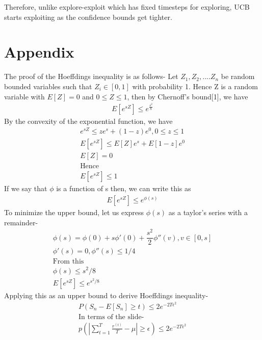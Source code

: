 \documentclass[11pt]{article}
\begin{document}
Therefore, unlike explore-exploit which has fixed timesteps for exploring, UCB starts exploiting as the confidence bounds get tighter.


\newpage
{


}

\section{Appendix}
The proof of the Hoeffdings inequality is as follows-
Let $Z_1, Z_2, .... Z_n$ be random bounded variables such that $Z_i \in [0,1]$ with probability 1. Hence Z is a random variable with $E[Z]=0$ and $0 \le Z \le 1$, then by Chernoff's bound[1], we have 
\begin{align*}
    E[e^{sZ}]\le e^{\frac{s^2}{8}}
\end{align*}
By the convexity of the exponential function, we have 
\begin{align*}
    e^{sZ} \le ze^s + (1-z)e^0, 0 \le z \le 1 \\
    E[e^{sZ}] \le E[Z]e^{s} + E[1-z]e^0 \\
    E[Z]=0 \\
    \text{Hence} \\
    E[e^{sZ}] \le 1
\end{align*}
If we say that $\phi$ is a function of s then, we can write this as
\begin{align*}
    E[e^{sZ}] \le e^{\phi(s)}
\end{align*}
To minimize the upper bound, let us express $\phi(s)$ as a taylor's series with a remainder-
\begin{align*}
    \phi(s) = \phi(0) + s \phi'(0) + \dfrac{s^2}{2}\phi''(v), v \in [0,s] \\
    \phi'(s)=0,  \phi''(s)\le 1/4\\
    \text{From this} \\
    \phi(s) \le s^2 /8 \\
    E[e^{sZ}] \le e^{s^2 /8}
\end{align*}
Applying this as an upper bound to derive Hoeffdings inequality- 
\begin{align*}
    P(S_n - E[S_n] \ge t) \le 2e^{-2T\epsilon^2} \\ 
    \text{In terms of the slide-} \\
    p \left( \left| \sum_{t=1}^T \frac{r^{(t)}}{T} - \mu \right| \geq \epsilon \right) \leq 2 e^{-2T\epsilon^2}
\end{align*}
\newpage
\end{document}
